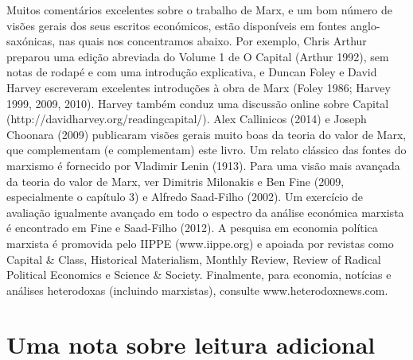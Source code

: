 Muitos comentários excelentes sobre o trabalho de Marx, e um bom número de visões gerais dos seus escritos económicos, estão disponíveis em fontes anglo-saxónicas, nas quais nos concentramos abaixo. Por exemplo, Chris Arthur preparou uma edição abreviada do Volume {\color{blue}1} de O Capital (Arthur 1992), sem notas de rodapé e com uma introdução explicativa, e Duncan Foley e David Harvey escreveram excelentes introduções à obra de Marx (Foley 1986; Harvey 1999, 2009, 2010). Harvey também conduz uma discussão online sobre Capital (http://davidharvey.org/readingcapital/). Alex Callinicos (2014) e Joseph Choonara (2009) publicaram visões gerais muito boas da teoria do valor de Marx, que complementam (e complementam) este livro. Um relato clássico das fontes do marxismo é fornecido por Vladimir Lenin (1913). Para uma visão mais avançada da teoria do valor de Marx, ver Dimitris Milonakis e Ben Fine (2009, especialmente o capítulo {\color{blue}3}) e Alfredo Saad-Filho (2002). Um exercício de avaliação igualmente avançado em todo o espectro da análise económica marxista é encontrado em Fine e Saad-Filho (2012). A pesquisa em economia política marxista é promovida pelo IIPPE (www.iippe.org) e apoiada por revistas como Capital & Class, Historical Materialism, Monthly Review, Review of Radical Political Economics e Science & Society. Finalmente, para economia, notícias e análises heterodoxas (incluindo marxistas), consulte www.heterodoxnews.com.
 \par 
\section{Uma nota sobre leitura adicional}
